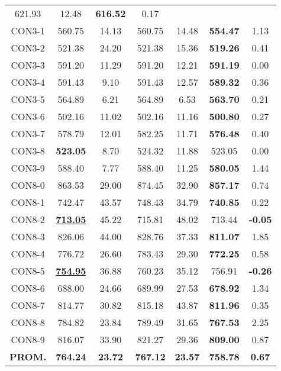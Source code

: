 \begin{table}[ht]
\begin{tabular}{c c c c c c c}
621.93 & 12.48 & \bf{616.52} & 
0.17\\CON3-1 & 560.75 & 14.13 & 
560.75 & 14.48 & \bf{554.47} & 
1.13\\CON3-2 & 521.38 & 24.20 & 
521.38 & 15.36 & \bf{519.26} & 
0.41\\CON3-3 & 591.20 & 11.29 & 
591.20 & 12.21 & \bf{591.19} & 
0.00\\CON3-4 & 591.43 & 9.10 & 
591.43 & 12.57 & \bf{589.32} & 
0.36\\CON3-5 & 564.89 & 6.21 & 
564.89 & 6.53 & \bf{563.70} & 
0.21\\CON3-6 & 502.16 & 11.02 & 
502.16 & 11.16 & \bf{500.80} & 
0.27\\CON3-7 & 578.79 & 12.01 & 
582.25 & 11.71 & \bf{576.48} & 
0.40\\CON3-8 & \bf{523.05} & 8.70 & 
524.32 & 11.88 & 523.05 & 0.00\\
CON3-9 & 588.40 & 7.77 & 
588.40 & 11.25 & \bf{580.05} & 
1.44\\CON8-0 & 863.53 & 29.00 & 
874.45 & 32.90 & \bf{857.17} & 
0.74\\CON8-1 & 742.47 & 43.57 & 
748.43 & 34.79 & \bf{740.85} & 
0.22\\CON8-2 & \bf{\underline{713.05}} & 45.22 & 
715.81 & 48.02 & 713.44 & 
\bf{-0.05}\\CON8-3 & 826.06 & 44.00 & 
828.76 & 37.33 & \bf{811.07} & 
1.85\\CON8-4 & 776.72 & 26.60 & 
783.43 & 29.30 & \bf{772.25} & 
0.58\\CON8-5 & \bf{\underline{754.95}} & 36.88 & 
760.23 & 35.12 & 756.91 & 
\bf{-0.26}\\CON8-6 & 688.00 & 24.66 & 
689.99 & 27.53 & \bf{678.92} & 
1.34\\CON8-7 & 814.77 & 30.82 & 
815.18 & 43.87 & \bf{811.96} & 
0.35\\CON8-8 & 784.82 & 23.84 & 
789.49 & 31.65 & \bf{767.53} & 
2.25\\CON8-9 & 816.07 & 33.90 & 
821.27 & 29.36 & \bf{809.00} & 
0.87\\\bf{PROM.} & 
\bf{764.24} & \bf{23.72} & \bf{767.12} & \bf{23.57} & \bf{758.78} & \bf{0.67}\\[1ex]\hline
\end{tabular}
\label{table:nonlin}
\end{table} \clearpage
